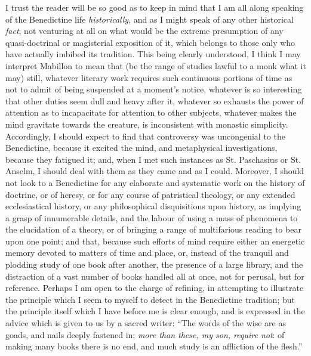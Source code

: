 I trust the reader will be so good as to keep in mind that I am all
along speaking of the Benedictine life \emph{historically}, and as I
might speak of any other historical \emph{fact}; not venturing at all
on what would be the extreme presumption of any quasi-doctrinal or
magisterial exposition of it, which belongs to those only who have
actually imbibed its tradition. This being clearly understood, I think
I may interpret Mabillon to mean that (be the range of studies lawful
to a monk what it may) still, whatever literary work requires such
continuous portions of time as not to admit of being suspended at a
moment's notice, whatever is so interesting that other duties seem
dull and heavy after it, whatever so exhausts the power of attention
as to incapacitate for attention to other subjects, whatever makes the
mind gravitate towards the creature, is inconsistent with monastic
simplicity. Accordingly, I should expect to find that controversy was
uncongenial to the Benedictine, because it excited the mind, and
metaphysical investigations, because they fatigued it; and, when I met
such instances as St. Paschasius or St. Anselm, I should deal with
them as they came and as I could. Moreover, I should not look to a
Benedictine for any elaborate and systematic work on the history of
doctrine, or of heresy, or for any course of patristical theology, or
any extended ecclesiastical history, or any philosophical
disquisitions upon history, as implying a grasp of innumerable
details, and the labour of using a mass of phenomena to the
elucidation of a theory, or of bringing a range of multifarious
reading to bear upon one point; and that, because such efforts of mind
require either an energetic memory devoted to matters of time and
place, or, instead of the tranquil and plodding study of one book
after another, the presence of a large library, and the distraction of
a vast number of books handled all at once, not for perusal, but for
reference. Perhaps I am open to the charge of refining, in attempting
to illustrate the principle which I seem to myself to detect in the
Benedictine tradition; but the principle itself which I have before me
is clear enough, and is expressed in the advice which is given to us
by a sacred writer: ``The words of the wise are as goads, and
nails deeply fastened in; \emph{more than these, my son, require not}:
of making many books there is no end, and much study is an affliction
of the flesh.''

